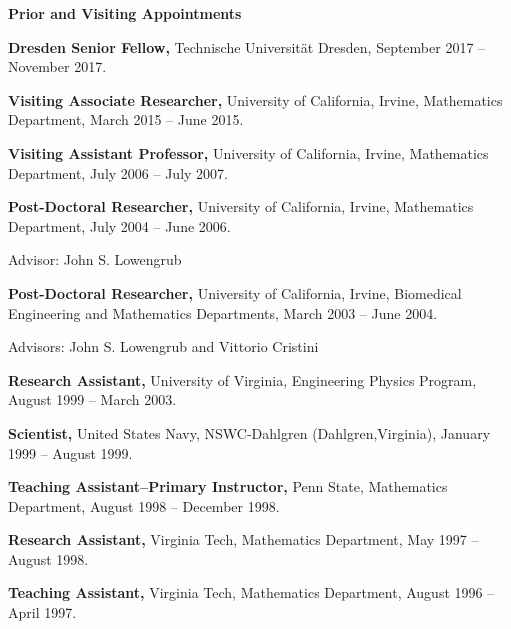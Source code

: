 \documentclass[11pt]{letter}
\begin{document}
	\smallskip

{\LARGE\bf  Prior and Visiting Appointments}
    \begin{description}    \item 
\textbf{Dresden Senior Fellow,} Technische Universit\"{a}t Dresden, September 2017 -- November 2017.
    \item 
\textbf{Visiting Associate Researcher,} University of California, Irvine,
Mathematics Department, March 2015 -- June 2015. 
    \item 
\textbf{Visiting Assistant Professor,} University of California, Irvine,
Mathematics Department, July 2006 -- July 2007.
    \item 
\textbf{Post-Doctoral Researcher,} University of California, Irvine, Mathematics Department, July 2004 -- June 2006.
    \begin{description}
    \item
Advisor: John S. Lowengrub
    \end{description}
    	\item 
\textbf{Post-Doctoral Researcher,} University of California, Irvine, Biomedical Engineering and Mathematics Departments, March 2003 -- June 2004.
    \begin{description}
    \item
Advisors: John S. Lowengrub and Vittorio Cristini
    \end{description}
	\item
\textbf{Research Assistant,} University of Virginia, Engineering Physics Program, August 1999 -- March 2003.
    \item
\textbf{Scientist,} United States Navy, NSWC-Dahlgren (Dahlgren,Virginia), January 1999 -- August 1999.
    \item
\textbf{Teaching Assistant--Primary Instructor,} Penn State, Mathematics Department, August 1998 -- December 1998.
    \item
\textbf{Research Assistant,} Virginia Tech, Mathematics Department, May 1997 -- August 1998.
    \item
\textbf{Teaching Assistant,} Virginia Tech, Mathematics Department, August 1996 -- April 1997.
    \end{description}
\end{document}

